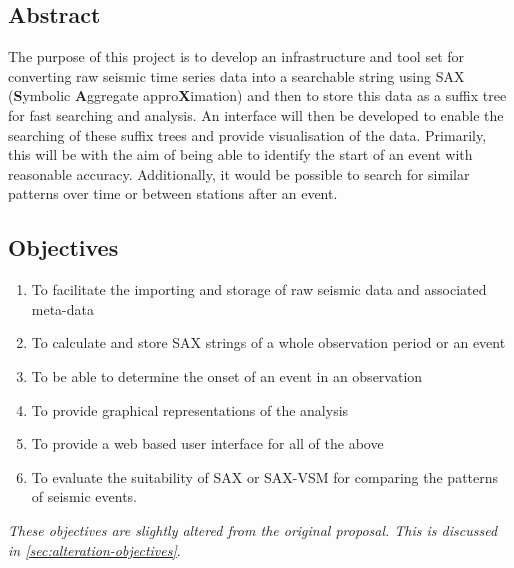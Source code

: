 \documentclass[../report.tex]{subfiles}
\begin{document}
\subsection{Abstract}

	The purpose of this project is to develop an infrastructure and tool set for converting raw seismic time series data into a searchable string using SAX (\textbf{S}ymbolic \textbf{A}ggregate appro\textbf{X}imation) and then to store this data as a suffix tree for fast searching and analysis.  An interface will then be developed to enable the searching of these suffix trees and provide visualisation of the data.  Primarily, this will be with the aim of being able to identify the start of an event with reasonable accuracy.  Additionally, it would be possible to search for similar patterns over time or between stations after an event.
	
\subsection{Objectives} \label{sec:objectives}
	\begin{enumerate}
		\item To facilitate the importing and storage of raw seismic data and associated meta-data
		\item To calculate and store SAX strings of a whole observation period or an event
		\item To be able to determine the onset of an event in an observation
		\item To provide graphical representations of the analysis
		\item To provide a web based user interface for all of the above
		\item To evaluate the suitability of SAX or SAX-VSM for comparing the patterns of seismic events.
	\end{enumerate}

	\textit{These objectives are slightly altered from the original proposal.  This is discussed in \cref{sec:alteration-objectives}}.
		
\end{document}
